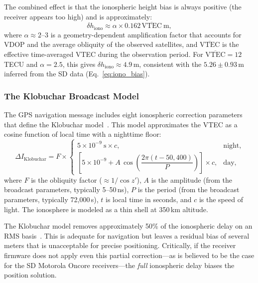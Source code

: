 The combined effect is that the ionospheric height bias is always positive (the receiver appears too high) and is approximately:
\begin{equation}
\delta h_{\text{iono}} \approx \alpha \times 0.162\,\overline{\text{VTEC}}~\text{m},
\label{eq:iono_height_bias}
\end{equation}
where $\alpha \approx 2$--3 is a geometry-dependent amplification factor that accounts for VDOP and the average obliquity of the observed satellites, and $\overline{\text{VTEC}}$ is the effective time-averaged VTEC during the observation period. For $\overline{\text{VTEC}} = 12$\,TECU and $\alpha = 2.5$, this gives $\delta h_{\text{iono}} \approx 4.9$\,m, consistent with the $5.26 \pm 0.93$\,m inferred from the SD data (Eq.~\ref{eq:iono_bias}).

\subsubsection{The Klobuchar Broadcast Model}

The GPS navigation message includes eight ionospheric correction parameters that define the Klobuchar model~\cite{klobuchar1987}. This model approximates the VTEC as a cosine function of local time with a nighttime floor:
\begin{equation}
\Delta I_{\text{Klobuchar}} = F \times
\begin{cases}
5 \times 10^{-9}~\text{s} \times c, & \text{night}, \\[4pt]
\left[5 \times 10^{-9} + A\,\cos\!\left(\dfrac{2\pi(t - 50{,}400)}{P}\right)\right]\!\times c, & \text{day},
\end{cases}
\label{eq:klobuchar}
\end{equation}
where $F$ is the obliquity factor ($\approx 1/\cos z'$), $A$ is the amplitude (from the broadcast parameters, typically 5--50\,ns), $P$ is the period (from the broadcast parameters, typically 72{,}000\,s), $t$ is local time in seconds, and $c$ is the speed of light. The ionosphere is modeled as a thin shell at 350\,km altitude.

The Klobuchar model removes approximately 50\% of the ionospheric delay on an RMS basis~\cite{klobuchar1987}. This is adequate for navigation but leaves a residual bias of several meters that is unacceptable for precise positioning. Critically, if the receiver firmware does not apply even this partial correction---as is believed to be the case for the SD Motorola Oncore receivers---the \emph{full} ionospheric delay biases the position solution.

